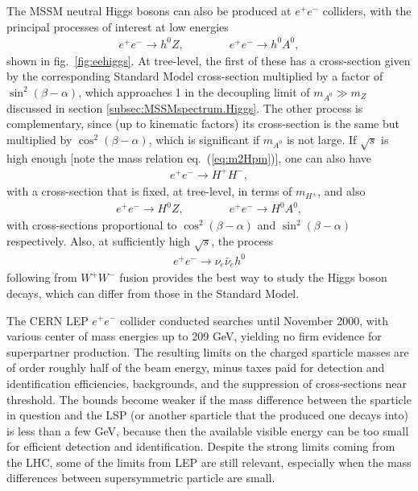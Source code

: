 \documentclass[11pt]{article}
\def\beq{\begin{eqnarray}}
\def\eeq{\end{eqnarray}}
\begin{document}
The MSSM neutral Higgs bosons can also be produced at $e^+e^-$ colliders,
with the principal processes of interest at low energies
\beq
e^+e^- \rightarrow h^0 Z,
\qquad\qquad
e^+e^-\rightarrow h^0A^0,
\eeq
shown in fig.~\ref{fig:eehiggs}. At tree-level, the first of these has a 
cross-section given by the corresponding Standard Model cross-section 
multiplied by a factor of $\sin^2(\beta - \alpha)$, which approaches 1 in 
the decoupling limit of $m_{A^0} \gg m_Z$ discussed in section 
\ref{subsec:MSSMspectrum.Higgs}. The other process is complementary, since 
(up to kinematic factors) its cross-section is the same but multiplied 
by $\cos^2(\beta - \alpha)$, which is significant if $m_{A^0}$ is not 
large. If $\sqrt{s}$ is high enough [note the mass relation 
eq.~(\ref{eq:m2Hpm})], one can also have
\beq
e^+e^-\rightarrow H^+ H^-,
\eeq
with a cross-section that is fixed, at tree-level, in terms of 
$m_{H^\pm}$, and also
\beq
e^+e^- \rightarrow H^0Z,
\qquad\qquad
e^+e^-\rightarrow H^0A^0,
\eeq
with cross-sections proportional to $\cos^2(\beta - \alpha)$ and 
$\sin^2(\beta - \alpha)$ respectively. Also, at sufficiently high 
$\sqrt{s}$, the process
\beq
e^+ e^- \rightarrow \nu_e \bar \nu_e h^0 
\eeq
following from $W^+W^-$ fusion provides the best way to study the Higgs 
boson decays, which can differ \cite{GunionHaber,HHG,Haber:1997dt} 
from those in the Standard Model.

The CERN LEP $e^+e^-$ collider conducted searches until November 2000, 
with various center of mass energies up to 209 GeV, yielding no firm 
evidence for superpartner production. The resulting limits 
\cite{LEPSUSYWG} on the charged sparticle masses are of order roughly half 
of the beam energy, minus taxes paid for detection and identification 
efficiencies, backgrounds, and the suppression of cross-sections near 
threshold. The bounds become weaker if the mass difference between the 
sparticle in question and the LSP (or another sparticle that the produced 
one decays into) is less than a few GeV, because then the available 
visible energy can be too small for efficient detection and identification.
Despite the strong limits coming from the LHC, some of the limits from LEP are still relevant, especially when the mass differences between supersymmetric particle
are small.
\end{document}
